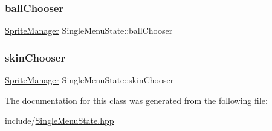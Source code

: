 \subsubsection{\texorpdfstring{ballChooser}{ballChooser}}
{\footnotesize\ttfamily \mbox{\hyperlink{class_sprite_manager}{Sprite\+Manager}} Single\+Menu\+State\+::ball\+Chooser}

\mbox{\label{class_single_menu_state_a9af6604efafd09a53f4305060741ea93}} 
\subsubsection{\texorpdfstring{skinChooser}{skinChooser}}
{\footnotesize\ttfamily \mbox{\hyperlink{class_sprite_manager}{Sprite\+Manager}} Single\+Menu\+State\+::skin\+Chooser}



The documentation for this class was generated from the following file\+:\begin{DoxyCompactItemize}
\item 
include/\mbox{\hyperlink{_single_menu_state_8hpp}{Single\+Menu\+State.\+hpp}}\end{DoxyCompactItemize}
